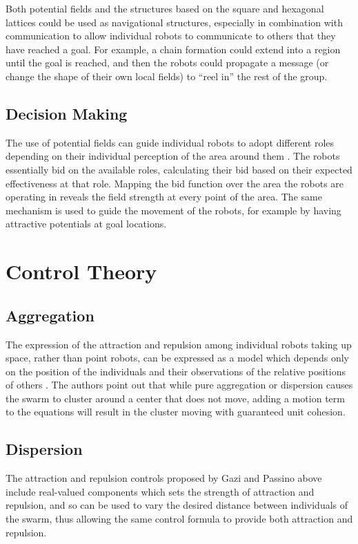 \documentclass[]{article}
\begin{document}
Both potential fields and the structures based on the square and hexagonal lattices could be used as navigational structures, especially in combination with communication to allow individual robots to communicate to others that they have reached a goal. 
For example, a chain formation could extend into a region until the goal is reached, and then the robots could propagate a message (or change the shape of their own local fields) to ``reel in'' the rest of the group. 

\subsection{Decision Making}

The use of potential fields can guide individual robots to adopt different roles depending on their individual perception of the area around them \cite{vail2003multi}.
The robots essentially bid on the available roles, calculating their bid based on their expected effectiveness at that role. 
Mapping the bid function over the area the robots are operating in reveals the field strength at every point of the area. 
The same mechanism is used to guide the movement of the robots, for example by having attractive potentials at goal locations. 

\section{Control Theory}

\subsection{Aggregation}

The expression of the attraction and repulsion among individual robots taking up space, rather than point robots, can be expressed as a model which depends only on the position of the individuals and their observations of the relative positions of others \cite{gazi2004class}. 
The authors point out that while pure aggregation or dispersion causes the swarm to cluster around a center that does not move, adding a motion term to the equations will result in the cluster moving with guaranteed unit cohesion. 

\subsection{Dispersion}

The attraction and repulsion controls proposed by Gazi and Passino above include real-valued components which sets the strength of attraction and repulsion, and so can be used to vary the desired distance between individuals of the swarm, thus allowing the same control formula to provide both attraction and repulsion. 
\end{document}
